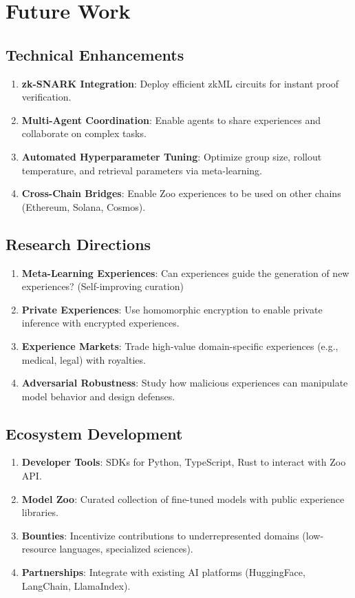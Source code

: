\section{Future Work}


\subsection{Technical Enhancements}

\begin{enumerate}
\item \textbf{zk-SNARK Integration}: Deploy efficient zkML circuits for instant proof verification.
\item \textbf{Multi-Agent Coordination}: Enable agents to share experiences and collaborate on complex tasks.
\item \textbf{Automated Hyperparameter Tuning}: Optimize group size, rollout temperature, and retrieval parameters via meta-learning.
\item \textbf{Cross-Chain Bridges}: Enable Zoo experiences to be used on other chains (Ethereum, Solana, Cosmos).
\end{enumerate}

\subsection{Research Directions}

\begin{enumerate}
\item \textbf{Meta-Learning Experiences}: Can experiences guide the generation of new experiences? (Self-improving curation)
\item \textbf{Private Experiences}: Use homomorphic encryption to enable private inference with encrypted experiences.
\item \textbf{Experience Markets}: Trade high-value domain-specific experiences (e.g., medical, legal) with royalties.
\item \textbf{Adversarial Robustness}: Study how malicious experiences can manipulate model behavior and design defenses.
\end{enumerate}

\subsection{Ecosystem Development}

\begin{enumerate}
\item \textbf{Developer Tools}: SDKs for Python, TypeScript, Rust to interact with Zoo API.
\item \textbf{Model Zoo}: Curated collection of fine-tuned models with public experience libraries.
\item \textbf{Bounties}: Incentivize contributions to underrepresented domains (low-resource languages, specialized sciences).
\item \textbf{Partnerships}: Integrate with existing AI platforms (HuggingFace, LangChain, LlamaIndex).
\end{enumerate}

